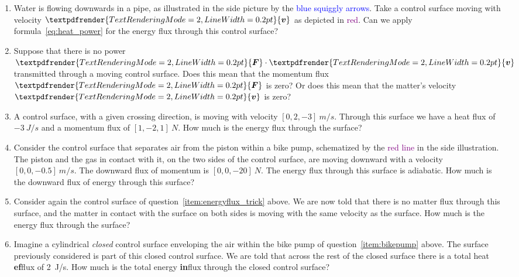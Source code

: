 \documentclass[a4paper,12pt,%
onecolumn,oneside,%
british%
]{memoir}
\renewcommand*{\bm}[1]{\textpdfrender{TextRenderingMode=2,LineWidth=0.2pt}{\boldsymbol{#1}}}
\renewcommand*{\|}[1][]{\nonscript\:#1\vert\nonscript\:\mathopen{}}
\newcommand*{\yv}{\bm{v}}
\newcommand*{\yF}{\bm{F}}
\begin{document}
\begin{exercise}
  \begin{enumerate}[exerc]
  \item Water is flowing downwards in a pipe, as illustrated in the side picture by the \textcolor{blue}{blue squiggly arrows}. Take a control surface moving with velocity $\yv$ as depicted in \textcolor{purple}{red}. Can we apply  formula~\eqref{eq:heat_power} for the energy flux through this control surface?

  \item Suppose that there is no power $\yF\cdot\yv$ transmitted through a moving control surface. Does this mean that the momentum flux $\yF$ is zero? Or does this mean that the matter's velocity $\yv$ is zero?

  \item\label{item:energyflux_trick} A control surface, with a given crossing direction, is moving with velocity $[0,2,-3]\:\unit{m/s}$. Through this surface we have a heat flux of $\qty{-3}{J/s}$ and a momentum flux of $[1,-2,1]\:\unit{N}$. How much is the energy flux through the surface?

  \item\label{item:bikepump} Consider the control surface that separates air from the piston within a bike pump, schematized by the \textcolor{purple}{red line} in the side illustration. The piston and the gas in contact with it, on the two sides of the control surface, are moving downward with a velocity $[0,0,-0.5]\:\unit{m/s}$. The downward flux of momentum is $[0,0,-20]\:\unit{N}$. The energy flux through this surface is adiabatic. How much is the downward flux of energy through this surface?

  \item Consider again the control surface of question~\ref{item:energyflux_trick} above. We are now told that there is no matter flux through this surface, and the matter in contact with the surface on both sides is moving with the same velocity as the surface. How much is the energy flux through the surface?

  \item Imagine a cylindrical \emph{closed} control surface enveloping the air within the bike pump of question~\ref{item:bikepump} above. The surface previously considered is part of this closed control surface. We are told that across the rest of the closed surface there is a total heat \textbf{ef}flux of \qty{2}{J/s}. How much is the total energy \textbf{in}flux through the closed control surface?
  \end{enumerate}
\end{exercise}
\end{document}
